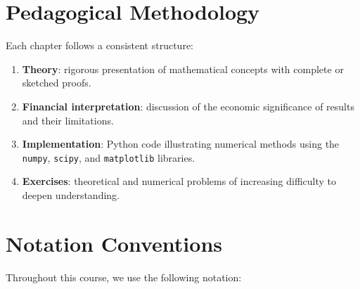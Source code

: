 \section*{Pedagogical Methodology}

Each chapter follows a consistent structure:

\begin{enumerate}
    \item \textbf{Theory}: rigorous presentation of mathematical concepts
          with complete or sketched proofs.
    \item \textbf{Financial interpretation}: discussion of the economic
          significance of results and their limitations.
    \item \textbf{Implementation}: Python code illustrating numerical methods
          using the \texttt{numpy}, \texttt{scipy}, and \texttt{matplotlib}
          libraries.
    \item \textbf{Exercises}: theoretical and numerical problems of increasing
          difficulty to deepen understanding.
\end{enumerate}

\section*{Notation Conventions}

Throughout this course, we use the following notation:


